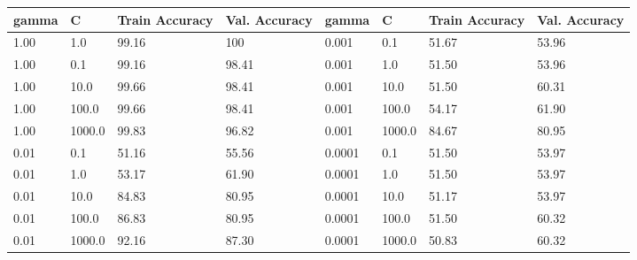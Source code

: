 \def\arraystretch{1.25}
\begin{center}
{\small
\begin{longtable}{l l l l l l l l}
\hline
\hline
\textbf{gamma} & \textbf{C} & \textbf{Train Accuracy}  & \textbf{Val. Accuracy} & \textbf{gamma} & \textbf{C} & \textbf{Train Accuracy}  & \textbf{Val. Accuracy}\\
\hline
\hline
1.00 & 1.0 & 99.16 & 100 & 0.001 & 0.1 & 51.67 & 53.96 \\
1.00 & 0.1 & 99.16 & 98.41  & 0.001 & 1.0 & 51.50 & 53.96 \\
1.00 & 10.0 & 99.66 & 98.41  & 0.001 & 10.0 & 51.50 & 60.31 \\
1.00 & 100.0 & 99.66 & 98.41  & 0.001 & 100.0 & 54.17 & 61.90 \\
1.00 & 1000.0 & 99.83 & 96.82  & 0.001 & 1000.0 & 84.67 & 80.95\\
0.01 & 0.1 & 51.16 & 55.56  & 0.0001 & 0.1 & 51.50 & 53.97 \\
0.01 & 1.0 & 53.17 & 61.90  & 0.0001 & 1.0 & 51.50 & 53.97 \\
0.01 & 10.0 & 84.83 & 80.95  & 0.0001 & 10.0 & 51.17 & 53.97 \\
0.01 & 100.0 & 86.83 & 80.95  & 0.0001 & 100.0 & 51.50 & 60.32 \\
0.01 & 1000.0 & 92.16 & 87.30  & 0.0001 & 1000.0 & 50.83 & 60.32 \\
\hline
\end{longtable}
\setcounter{table}{2}
}
\end{center}